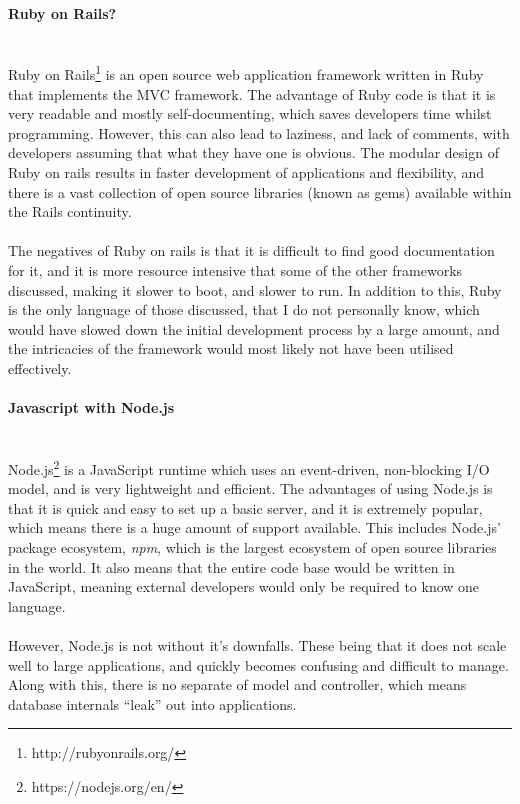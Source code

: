 \paragraph{Ruby on Rails?}\ \\
Ruby on Rails\footnote{http://rubyonrails.org/} is an open source web application framework written in Ruby that implements the MVC framework. The advantage of Ruby code is that it is very readable and mostly self-documenting, which saves developers time whilst programming. However, this can also lead to laziness, and lack of comments, with developers assuming that what they have one is obvious. The modular design of Ruby on rails results in faster development of applications and flexibility, and there is a vast collection of open source libraries (known as gems) available within the Rails continuity.\ \\
\ \\
The negatives of Ruby on rails is that it is difficult to find good documentation for it, and it is more resource intensive that some of the other frameworks discussed, making it slower to boot, and slower to run. In addition to this, Ruby is the only language of those discussed, that I do not personally know, which would have slowed down the initial development process by a large amount, and the intricacies of the framework would most likely not have been utilised effectively.

\paragraph{Javascript with Node.js}\ \\
Node.js\footnote{https://nodejs.org/en/} is a JavaScript runtime which uses an event-driven, non-blocking I/O model, and is very lightweight and efficient. The advantages of using Node.js is that it is quick and easy to set up a basic server, and it is extremely popular, which means there is a huge amount of support available. This includes Node.js' package ecosystem, \textit{npm}, which is the largest ecosystem of open source libraries in the world. It also means that the entire code base would be written in JavaScript, meaning external developers would only be required to know one language. \ \\
\ \\
However, Node.js is not without it's downfalls. These being that it does not scale well to large applications, and quickly becomes confusing and difficult to manage. Along with this, there is no separate of model and controller, which means database internals ``leak'' out into applications.

